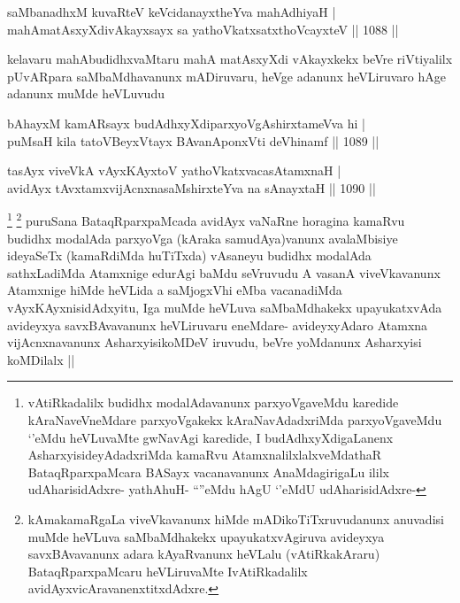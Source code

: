 
\begin{shl}
saMbanadhxM kuvaRteV keVcidanayxtheYva mahAdhiyaH | \\
mahAmatAsxyXdivAkayxsayx sa yathoVkatxsatxthoVcayxteV \hfill||  1088 ||  
\end{shl}

\begin{artha}
kelavaru mahAbudidhxvaMtaru mahA matAsxyXdi vAkayxkekx beVre riVtiyalilx pUvARpara saMbaMdhavanunx mADiruvaru, heVge adanunx heVLiruvaro hAge adanunx muMde heVLuvudu
\end{artha}

\begin{shl}
bAhayxM kamARsayx budAdhxyXdiparxyoVgAshirxtameVva hi | \\
puMsaH kila tatoV\s BeyxVtayx BAvanA\s \s ponxVti deVhinamf \hfill||  1089 ||  
\end{shl}
				
\begin{shl}
tasAyx viveVkA vAyxKAyxtoV yathoVkatxvacasA\s \s tamxnaH | \\
avidAyx tAvxtamxvijAcnxnasaMshirxteYva na sA\s nayxtaH \hfill||  1090 ||  
\end{shl}

\begin{artha}
\footnote{vAtiRkadalilx budidhx modalAdavanunx parxyoVgaveMdu karedide kAraNaveVneMdare parxyoVgakekx kAraNavAdadxriMda parxyoVgaveMdu `\stext'eMdu heVLuvaMte gwNavAgi karedide, I budAdhxyXdigaLanenx AsharxyisideyAdadxriMda kamaRvu AtamxnalilxlalxveMdathaR BataqRparxpaMcara BASayx vacanavanunx AnaMdagirigaLu ililx udAharisidAdxre- yathAhuH- ``\stext''eMdu hAgU `\stext'eMdU udAharisidAdxre-}
\footnote{kAmakamaRgaLa viveVkavanunx hiMde mADikoTiTxruvudanunx anuvadisi muMde heVLuva saMbaMdhakekx upayukatxvAgiruva avideyxya savxBAvavanunx adara kAyaRvanunx heVLalu (vAtiRkakAraru) BataqRparxpaMcaru heVLiruvaMte IvAtiRkadalilx avidAyxvicAravanenxtitxdAdxre.}
puruSana BataqRparxpaMcada avidAyx vaNaRne horagina kamaRvu budidhx modalAda parxyoVga (kAraka samudAya)vanunx avalaMbisiye ideyaSeTx (kamaRdiMda huTiTxda) vAsaneyu budidhx modalAda sathxLadiMda Atamxnige edurAgi baMdu seVruvudu A vasanA viveVkavanunx Atamxnige hiMde heVLida a saMjogxVhi eMba vacanadiMda vAyxKAyxnisidAdxyitu, Iga muMde heVLuva saMbaMdhakekx upayukatxvAda avideyxya savxBAvavanunx heVLiruvaru eneMdare- avideyxyAdaro Atamxna vijAcnxnavanunx AsharxyisikoMDeV iruvudu, beVre yoMdanunx Asharxyisi koMDilalx ||
\end{artha}

